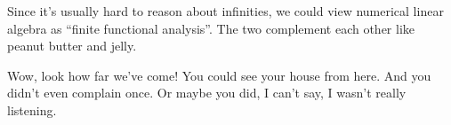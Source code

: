 Since it's usually hard to reason about infinities, we could view
numerical linear algebra as ``finite functional analysis''. The two
complement each other like peanut butter and jelly.

Wow, look how far we've come! You could see your house from here. And
you didn't even complain once. Or maybe you did, I can't say, I wasn't
really listening.